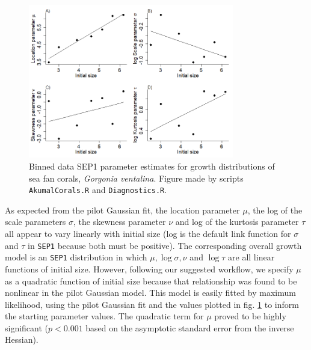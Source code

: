 \documentclass[12pt]{article}
\begin{document}
\begin{figure}[tbp]
\centering
\includegraphics[width=0.8\textwidth]{figures/AkumalRollingSEP1pars.png}
\caption{Binned data SEP1 parameter estimates for growth distributions of sea fan corals, \emph{Gorgonia ventalina}. 
Figure made by scripts \texttt{AkumalCorals.R} and \texttt{Diagnostics.R}.}
\label{fig:AkumalRollingSEP1pars}
\end{figure} 

As expected from the pilot Gaussian fit, the location parameter $\mu$, the log of the scale parameters $\sigma$, the 
skewness parameter $\nu$ and log of the kurtosis parameter $\tau$ all appear to vary linearly with initial size 
(log is the default link function for $\sigma$ and $\tau$ in \texttt{SEP1} because both must be positive).
The corresponding overall growth model is an \texttt{SEP1} distribution in 
which $\mu, \log \sigma, \nu$ and $\log \tau$ are all linear functions of initial size.
However, following our suggested workflow, we specify $\mu$ as a quadratic function of initial size because that relationship
was found to be nonlinear in the pilot Gaussian model. This model is easily fitted by maximum likelihood, 
using the pilot Gaussian fit and the values plotted in fig. \ref{fig:AkumalRollingSEP1pars} to 
inform the starting parameter values. The quadratic term for $\mu$ proved to be highly significant
($p<0.001$ based on the asymptotic standard error from the inverse Hessian). 
\end{document}
